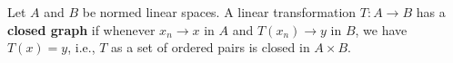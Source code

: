 Let $A$ and $B$ be normed linear spaces. A linear transformation $T: A \to B$ has a \textbf{closed graph} if whenever $x_n \to x$ in $A$ and $T(x_n) \to y$ in $B$, we have $T(x) = y$, i.e., $T$ as a set of ordered pairs is closed in $A \times B$.
